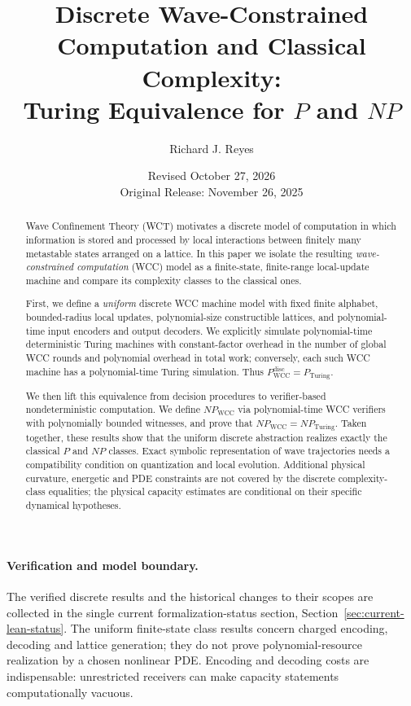 \documentclass[12pt]{article}
\title{Discrete Wave-Constrained Computation and Classical Complexity:\\
Turing Equivalence for $P$ and $NP$}
\author{Richard J. Reyes}
\date{Revised October 27, 2026 \\ \small Original Release: November 26, 2025}
\begin{document}
\maketitle

\begin{abstract}
Wave Confinement Theory (WCT) motivates a discrete model of computation in which
information is stored and processed by local interactions between finitely many
metastable states arranged on a lattice. In this paper we isolate the resulting
\emph{wave-constrained computation} (WCC) model as a finite-state, finite-range
local-update machine and compare its complexity classes to the classical ones.

First, we define a \emph{uniform} discrete WCC machine model with fixed finite
alphabet, bounded-radius local updates, polynomial-size constructible lattices,
and polynomial-time input encoders and output decoders. We explicitly simulate
polynomial-time deterministic Turing machines with constant-factor overhead in
the number of global WCC rounds and polynomial overhead in total work; conversely,
each such WCC machine has a polynomial-time Turing simulation. Thus
$P_{\mathrm{WCC}}^{\mathrm{disc}} = P_{\mathrm{Turing}}$.

We then lift this equivalence from decision procedures to verifier-based
nondeterministic computation. We define $NP_{\mathrm{WCC}}$ via polynomial-time
WCC verifiers with polynomially bounded witnesses, and prove that
$NP_{\mathrm{WCC}} = NP_{\mathrm{Turing}}$.
Taken together, these results show that the uniform discrete abstraction
realizes exactly the classical $P$ and $NP$ classes. Exact symbolic representation
of wave trajectories needs a compatibility condition on quantization and local
evolution. Additional physical curvature, energetic and PDE constraints are
not covered by the discrete complexity-class equalities; the physical
capacity estimates are conditional on their specific dynamical hypotheses.

\end{abstract}

\paragraph{Verification and model boundary.}
The verified discrete results and the historical changes
to their scopes are collected in the single current
formalization-status section,
Section~\ref{sec:current-lean-status}.
The uniform finite-state class results concern charged
encoding, decoding and lattice generation; they do not
prove polynomial-resource realization by a chosen
nonlinear PDE.  Encoding and decoding costs are
indispensable: unrestricted receivers can make
capacity statements computationally vacuous.
\end{document}
